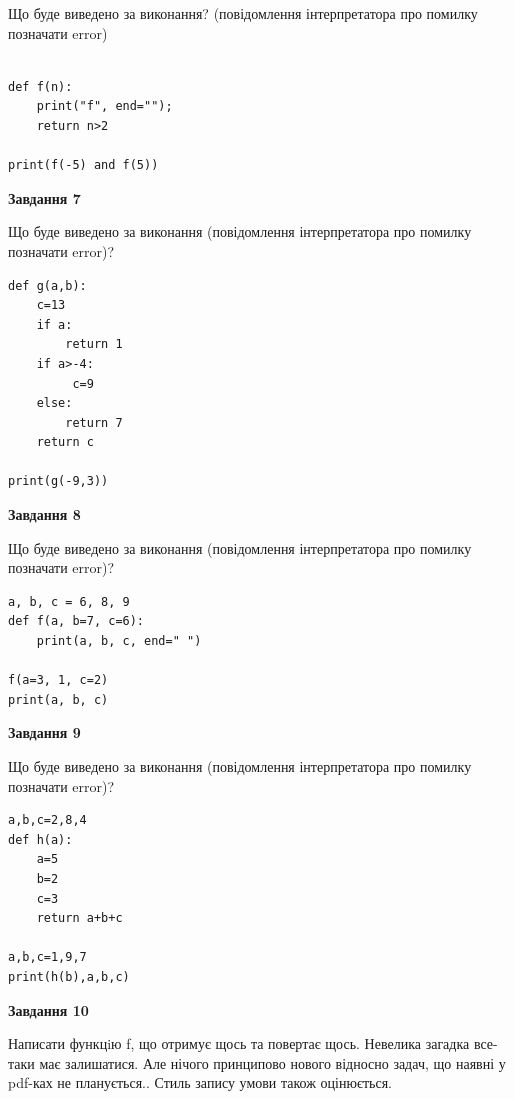 \documentclass[12pt, ukrainian]{article}
\begin{document}
{\begin {large}
Що буде виведено за виконання? (повідомлення інтерпретатора про помилку позначати error)\par
\begin{verbatim}

def f(n):
    print("f", end="");
    return n>2

print(f(-5) and f(5))
\end{verbatim}

{\begin {center}\textbf{Завдання 7}\end {center}}

Що буде виведено за виконання (повідомлення інтерпретатора про помилку позначати error)?\par
\begin{verbatim}
def g(a,b):
    c=13
    if a:
        return 1
    if a>-4:
         c=9
    else: 
        return 7
    return c

print(g(-9,3))
\end{verbatim}

{\begin {center}\textbf{Завдання 8}\end {center}}

Що буде виведено за виконання (повідомлення інтерпретатора про помилку позначати error)?\par
\begin{verbatim}
a, b, c = 6, 8, 9
def f(a, b=7, c=6):
    print(a, b, c, end=" ")

f(a=3, 1, c=2)
print(a, b, c)
\end{verbatim}

{\begin {center}\textbf{Завдання 9}\end {center}}

Що буде виведено за виконання (повідомлення інтерпретатора про помилку позначати error)?\par
\begin{verbatim}
a,b,c=2,8,4
def h(a):
    a=5
    b=2
    c=3
    return a+b+c

a,b,c=1,9,7
print(h(b),a,b,c)
\end{verbatim}

{\begin {center}\textbf{Завдання 10}\end {center}}


Написати функцiю f, що отримує щось та повертає щось. Невелика загадка все-таки має залишатися. Але нічого принципово нового відносно задач, що наявні у pdf-ках не планується.. Стиль запису умови також оцінюється.\par
\end {large}}
\newpage
\end{document}

